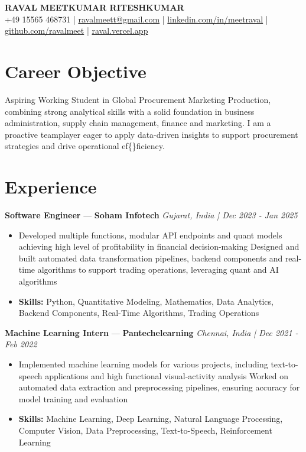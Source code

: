 \documentclass[a4paper,10pt]{article}
\begin{document}
\begin{center}
  {\Large\bfseries RAVAL MEETKUMAR RITESHKUMAR}\\[2pt]
  {\small +49 15565 468731 \;|\; \href{mailto:ravalmeett@gmail.com}{ravalmeett@gmail.com} \;|\; \href{https://www.linkedin.com/in/meetraval/}{linkedin.com/in/meetraval} \;|\; \href{https://github.com/ravalmeet}{github.com/ravalmeet} \;|\; \href{https://raval.vercel.app/}{raval.vercel.app}}
\end{center}
\vspace{-3pt}

\section*{Career Objective}
Aspiring Working Student in Global Procurement Marketing Production, combining strong analytical skills with a solid foundation in business administration, supply chain management, finance and marketing. I am a proactive teamplayer eager to apply data-driven insights to support procurement strategies and drive operational ef\{\}ficiency.\par

\section*{Experience}
\textbf{Software Engineer} — \textbf{Soham Infotech} \hfill \textit{Gujarat, India \;|\; Dec 2023 - Jan 2025}\par
\vspace{1pt}
\begin{itemize}
  \item Developed multiple functions, modular API endpoints and quant models achieving high level of profitability in financial decision-making Designed and built automated data transformation pipelines, backend components and real-time algorithms to support trading operations, leveraging quant and AI algorithms
  \item \textbf{Skills:} Python, Quantitative Modeling, Mathematics, Data Analytics, Backend Components, Real-Time Algorithms, Trading Operations
\end{itemize}
\vspace{3pt}
\textbf{Machine Learning Intern} — \textbf{Pantechelearning} \hfill \textit{Chennai, India \;|\; Dec 2021 - Feb 2022}\par
\vspace{1pt}
\begin{itemize}
  \item Implemented machine learning models for various projects, including text-to-speech applications and high functional visual-activity analysis Worked on automated data extraction and preprocessing pipelines, ensuring accuracy for model training and evaluation
  \item \textbf{Skills:} Machine Learning, Deep Learning, Natural Language Processing, Computer Vision, Data Preprocessing, Text-to-Speech, Reinforcement Learning
\end{itemize}
\end{document}
